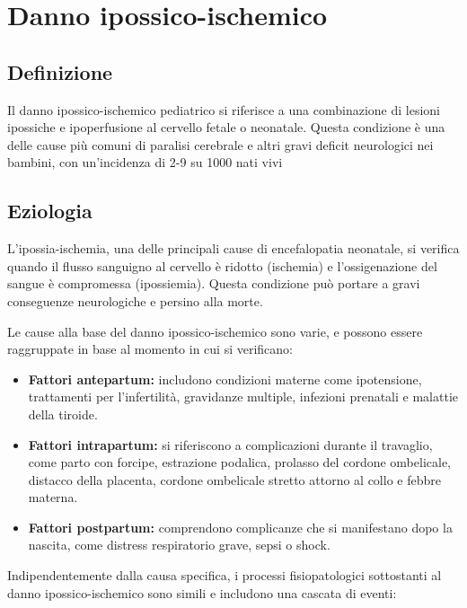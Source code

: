 \section{Danno ipossico-ischemico}

\subsection{Definizione}
Il danno ipossico-ischemico pediatrico si riferisce a una combinazione di lesioni ipossiche e ipoperfusione al cervello fetale o neonatale. Questa condizione è una delle cause più comuni di paralisi cerebrale e altri gravi deficit neurologici nei bambini, con un'incidenza di 2-9 su 1000 nati vivi

\subsection{Eziologia}
L'ipossia-ischemia, una delle principali cause di encefalopatia neonatale, si verifica quando il flusso sanguigno al cervello è ridotto (ischemia) e l'ossigenazione del sangue è compromessa (ipossiemia). Questa condizione può portare a gravi conseguenze neurologiche e persino alla morte.

Le cause alla base del danno ipossico-ischemico sono varie, e possono essere raggruppate in base al momento in cui si verificano:

\begin{itemize}
	\tightlist
	\item
	\textbf{Fattori antepartum:} includono condizioni materne come ipotensione, trattamenti per l'infertilità, gravidanze multiple, infezioni prenatali e malattie della tiroide.
	\item
	\textbf{Fattori intrapartum:} si riferiscono a complicazioni durante il travaglio, come parto con forcipe, estrazione podalica, prolasso del cordone ombelicale, distacco della placenta, cordone ombelicale stretto attorno al collo e febbre materna.
	\item
	\textbf{Fattori postpartum:} comprendono complicanze che si manifestano dopo la nascita, come distress respiratorio grave, sepsi o shock.
\end{itemize}

Indipendentemente dalla causa specifica, i processi fisiopatologici sottostanti al danno ipossico-ischemico sono simili e includono una cascata di eventi:

